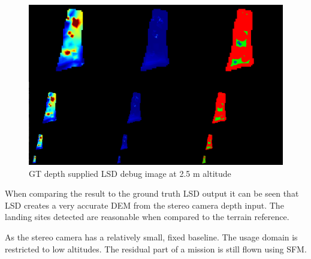 \clearpage %

\begin{figure}[ht!]
    \centering
    \includegraphics[scale=0.25]{images/preparation/GT_2.5m.png}
    \caption{GT depth supplied LSD debug image at 2.5 m altitude}
    \label{stereo_GT}
\end{figure}

When comparing the result to the ground truth LSD output it can be seen that LSD creates a very accurate DEM from the stereo camera depth input. The landing sites detected are reasonable when compared to the terrain reference. 

As the stereo camera has a relatively small, fixed baseline. The usage domain is restricted to low altitudes. The residual part of a mission is still flown using SFM. 







